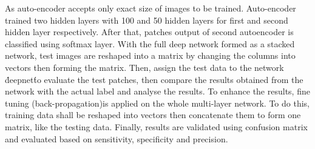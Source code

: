 As auto-encoder accepts only exact size of images to be trained.
Auto-encoder trained two hidden layers with 100 and 50 hidden layers for first and second hidden layer respectively.
After that, patches output of second autoencoder is classified using softmax layer.
With the full deep network formed as a stacked network, test images are reshaped into a matrix by changing the columns into vectors then forming the matrix.
Then, assign the test data to the network \'deepnet\'to evaluate the test patches, then compare the results obtained from the network with the actual label and analyse the results.  
To enhance the results, fine tuning (back-propagation)is applied on the whole multi-layer network.
To do this, training data shall be reshaped into vectors then concatenate them to form one matrix, like the testing data.
Finally, results are validated using confusion matrix and evaluated based on sensitivity, specificity and precision.
